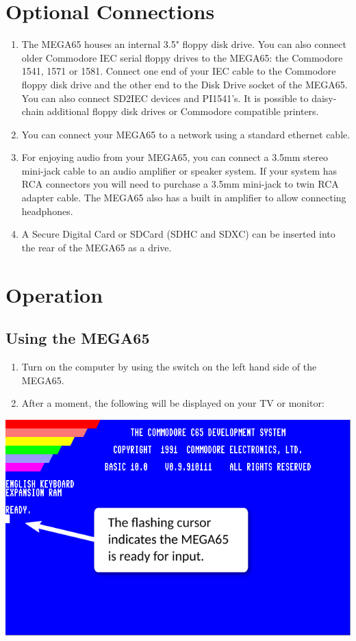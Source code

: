 \section{Optional Connections}

\begin{enumerate}
	\item The MEGA65 houses an internal 3.5" floppy disk drive. You can also connect older Commodore{\textregistered} IEC serial floppy drives to the MEGA65: the Commodore{\textregistered} 1541, 1571 or 1581. Connect one end of your IEC cable to the Commodore{\textregistered} floppy disk drive and the other end to the Disk Drive socket of the MEGA65. You can also connect SD2IEC devices and PI1541's. It is possible to daisy-chain additional floppy disk drives or Commodore{\textregistered} compatible printers.
	\item You can connect your MEGA65 to a network using a standard ethernet cable.
	\item For enjoying audio from your MEGA65, you can connect a 3.5mm stereo mini-jack cable to an audio amplifier or speaker system. If your system has RCA connectors you will need to purchase a 3.5mm mini-jack to twin RCA adapter cable. The MEGA65 also has a built in amplifier to allow connecting headphones.
	\item A Secure Digital Card or SDCard (SDHC and SDXC) can be inserted into the rear of the MEGA65 as a drive.
\end{enumerate}


\section{Operation}

\subsection{Using the MEGA65}

\begin{enumerate}
	\item Turn on the computer by using the switch on the left hand side of the MEGA65.
	\item After a moment, the following will be displayed on your TV or monitor:
\end{enumerate}

\includegraphics[width=\linewidth]{images/introduction-screen/switched-on.png}

